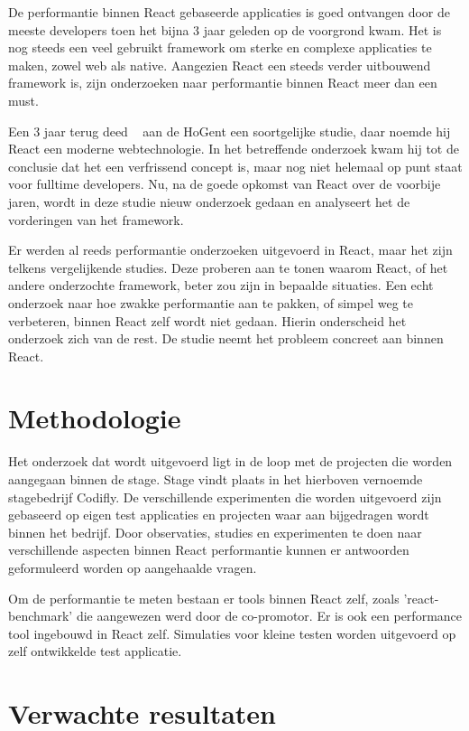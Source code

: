 \documentclass[fleqn,10pt]{voorstel}
\begin{document}
De performantie binnen React gebaseerde applicaties is goed ontvangen door de meeste developers toen het bijna 3 jaar geleden op de voorgrond kwam. Het is nog steeds een veel gebruikt framework om sterke en complexe applicaties te maken, zowel web als native. Aangezien React een steeds verder uitbouwend framework is, zijn onderzoeken naar performantie binnen React meer dan een must. 

Een 3 jaar terug deed ~\textcite{DeCock2016} aan de HoGent een soortgelijke studie, daar noemde hij React een moderne webtechnologie. In het betreffende onderzoek kwam hij tot de conclusie dat het een verfrissend concept is, maar nog niet helemaal op punt staat voor fulltime developers. Nu, na de goede opkomst van React over de voorbije jaren, wordt in deze studie nieuw onderzoek gedaan en analyseert het de vorderingen van het framework.

Er werden al reeds performantie onderzoeken uitgevoerd in React, maar het zijn telkens vergelijkende studies. Deze proberen aan te tonen waarom React, of het andere onderzochte framework, beter zou zijn in bepaalde situaties. Een echt onderzoek naar hoe zwakke performantie aan te pakken, of simpel weg te verbeteren, binnen React zelf wordt niet gedaan. Hierin onderscheid het onderzoek zich van de rest. De studie neemt het probleem concreet aan binnen React.

\section{Methodologie}

Het onderzoek dat wordt uitgevoerd ligt in de loop met de projecten die worden aangegaan binnen de stage. Stage vindt plaats in het hierboven vernoemde stagebedrijf Codifly. De verschillende experimenten die worden uitgevoerd zijn gebaseerd op eigen test applicaties en projecten waar aan bijgedragen wordt binnen het bedrijf. Door observaties, studies en experimenten te doen naar verschillende aspecten binnen React performantie kunnen er antwoorden geformuleerd worden op aangehaalde vragen.

Om de performantie te meten bestaan er tools binnen React zelf, zoals 'react-benchmark' die aangewezen werd door de co-promotor. Er is ook een performance tool ingebouwd in React zelf. Simulaties voor kleine testen worden uitgevoerd op zelf ontwikkelde test applicatie. 

\section{Verwachte resultaten}
\end{document}

